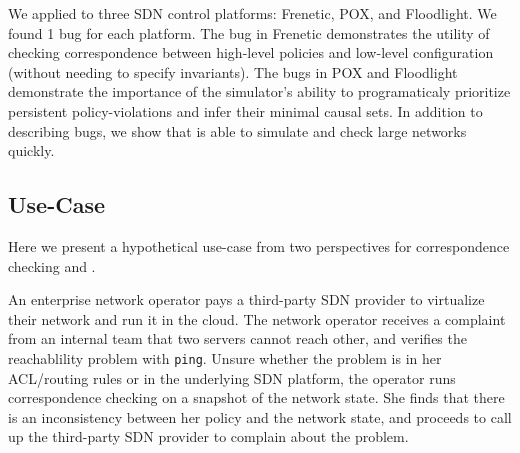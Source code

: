 We applied \projectname{} to three SDN control platforms: 
Frenetic, POX, and Floodlight. We found 1 bug for each platform.
The bug in Frenetic demonstrates 
the utility of checking correspondence between high-level policies and
low-level configuration (without needing to specify invariants). The bugs in 
POX and Floodlight demonstrate the importance of the simulator's ability to 
programaticaly prioritize persistent policy-violations and infer their minimal
causal sets. In addition to describing bugs, we show that \projectname{} is able 
to simulate and check large networks quickly.

\subsection{Use-Case}

Here we present a hypothetical use-case from two perspectives
for correspondence checking and \simulator{}.

 An enterprise network
operator pays a third-party SDN provider to virtualize their network
and run it in the cloud. The network operator receives a complaint
from an internal team that two servers cannot reach other, and 
verifies the reachablility problem with {\tt ping}. Unsure
whether the problem is in her ACL/routing rules 
or in the underlying SDN platform, the
operator runs correspondence checking on a snapshot of the network state. She
finds that there is an inconsistency between her policy and the network state, 
and proceeds to call up the third-party SDN provider to complain
about the problem.

